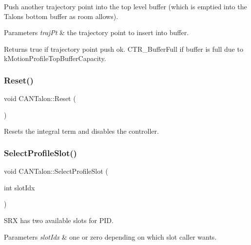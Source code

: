 Push another trajectory point into the top level buffer (which is emptied into the Talon\textquotesingle{}s bottom buffer as room allows).


\begin{DoxyParams}{Parameters}
{\em traj\+Pt} & the trajectory point to insert into buffer. \\
\hline
\end{DoxyParams}
\begin{DoxyReturn}{Returns}
true if trajectory point push ok. C\+T\+R\+\_\+\+Buffer\+Full if buffer is full due to k\+Motion\+Profile\+Top\+Buffer\+Capacity. 
\end{DoxyReturn}
\mbox{\label{class_c_a_n_talon_acb83bdcca65d305472d1f7c23ae6d2ee}} 
\subsubsection{\texorpdfstring{Reset()}{Reset()}}
{\footnotesize\ttfamily void C\+A\+N\+Talon\+::\+Reset (\begin{DoxyParamCaption}{ }\end{DoxyParamCaption})\hspace{0.3cm}{\ttfamily [override]}}

Resets the integral term and disables the controller. \mbox{\label{class_c_a_n_talon_a0f478462884ed5e541179821c44b724f}} 
\subsubsection{\texorpdfstring{Select\+Profile\+Slot()}{SelectProfileSlot()}}
{\footnotesize\ttfamily void C\+A\+N\+Talon\+::\+Select\+Profile\+Slot (\begin{DoxyParamCaption}\item[{int}]{slot\+Idx }\end{DoxyParamCaption})}

S\+RX has two available slots for P\+ID. 
\begin{DoxyParams}{Parameters}
{\em slot\+Idx} & one or zero depending on which slot caller wants. \\
\hline
\end{DoxyParams}
\mbox{\label{class_c_a_n_talon_a4562f7fb454693a0b19e6eba955a0c71}} 
